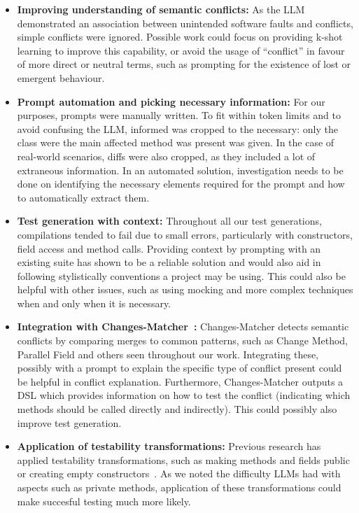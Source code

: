 \begin{itemize}
\item \textbf{Improving understanding of semantic conflicts:} As the LLM demonstrated an association between unintended software faults and conflicts, simple conflicts were ignored.
Possible work could focus on providing k-shot learning to improve this capability, or avoid the usage of ``conflict'' in favour of more direct or neutral terms, such as prompting
for the existence of lost or emergent behaviour.

\item \textbf{Prompt automation and picking necessary information:} For our purposes, prompts were manually written. To fit within token limits and to avoid confusing the LLM, informed was cropped to
the necessary: only the class were the main affected method was present was given. In the case of real-world scenarios, diffs were also cropped, as they included a lot of extraneous information.
In an automated solution, investigation needs to be done on identifying the necessary elements required for the prompt and how to automatically extract them.

\item \textbf{Test generation with context:} Throughout all our test generations, compilations tended to fail due to small errors, particularly with constructors, field access and method calls.
Providing context by prompting with an existing suite has shown to be a reliable solution and would also aid in following stylistically conventions a project may be using.
This could also be helpful with other issues, such as using mocking and more complex techniques when and only when it is necessary.

\item \textbf{Integration with Changes-Matcher~\cite{kn:nuno}:} Changes-Matcher detects semantic conflicts by comparing merges to common patterns, such as Change Method, Parallel Field and others
seen throughout our work. Integrating these, possibly with a prompt to explain the specific type of conflict present could be helpful in conflict explanation.
Furthermore, Changes-Matcher outputs a DSL which provides information on how to test the conflict (indicating which methods should be called directly and indirectly). This could possibly
also improve test generation.

\item \textbf{Application of testability transformations:} Previous research has applied testability transformations, such as making methods and fields public or creating empty constructors~\cite{kn:leuson}.
As we noted the difficulty LLMs had with aspects such as private methods, application of these transformations could make succesful testing much more likely.
\end{itemize}

